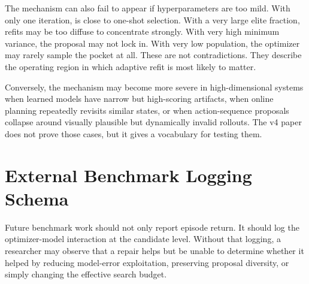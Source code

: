 The mechanism can also fail to appear if \cem{} hyperparameters are too mild.
With only one iteration, \cem{} is close to one-shot selection. With a very
large elite fraction, refits may be too diffuse to concentrate strongly. With
very high minimum variance, the proposal may not lock in. With very low
population, the optimizer may rarely sample the pocket at all. These are not
contradictions. They describe the operating region in which adaptive refit is
most likely to matter.

Conversely, the mechanism may become more severe in high-dimensional systems
when learned models have narrow but high-scoring artifacts, when online
planning repeatedly revisits similar states, or when action-sequence proposals
collapse around visually plausible but dynamically invalid rollouts. The v4
paper does not prove those cases, but it gives a vocabulary for testing them.

\section{External Benchmark Logging Schema}
\label{app:logging-schema}

Future benchmark work should not only report episode return. It should log the
optimizer-model interaction at the candidate level. Without that logging, a
researcher may observe that a repair helps but be unable to determine whether
it helped by reducing model-error exploitation, preserving proposal diversity,
or simply changing the effective search budget.

